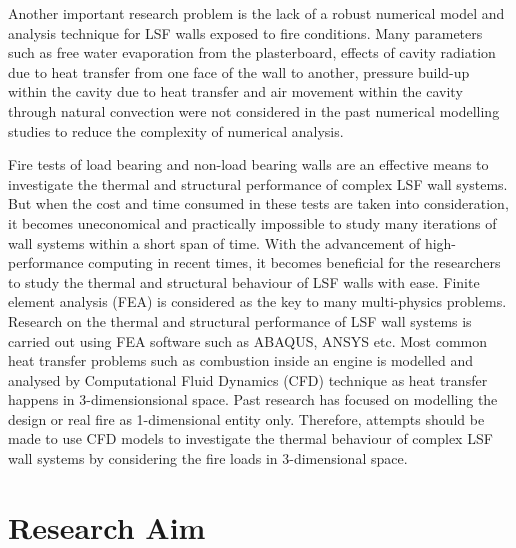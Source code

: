 Another important research problem is the lack of a robust numerical model and analysis technique for LSF walls exposed to fire conditions. Many parameters such as free water evaporation from the plasterboard, effects of cavity radiation due to heat transfer from one face of the wall to another, pressure build-up within the cavity due to heat transfer and air movement within the cavity through natural convection were not considered in the past numerical modelling studies to reduce the complexity of numerical analysis. 

Fire tests of load bearing and non-load bearing walls are an effective means to investigate the thermal and structural performance of complex LSF wall systems. But when the cost and time consumed in these tests are taken into consideration, it becomes uneconomical and practically impossible to study many iterations of wall systems within a short span of time. With the advancement of high-performance computing in recent times, it becomes beneficial for the researchers to study the thermal and structural behaviour of LSF walls with ease. Finite element analysis (FEA) is considered as the key to many multi-physics problems. Research on the thermal and structural performance of LSF wall systems is carried out using FEA software such as ABAQUS, ANSYS etc. Most common heat transfer problems such as combustion inside an engine is modelled and analysed by Computational Fluid Dynamics (CFD) technique as heat transfer happens in 3-dimensionsional space. Past research has focused on modelling the design or real fire as 1-dimensional entity only. Therefore, attempts should be made to use CFD models to investigate the thermal behaviour of complex LSF wall systems by considering the fire loads in 3-dimensional space.

\section{Research Aim}

